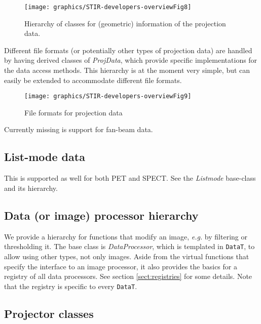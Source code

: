 \documentclass{article}
\begin{document}
\begin{figure}[htbp]
\begin{center}
\texttt{[image: graphics/STIR-developers-overviewFig8]}
\caption{ Hierarchy of classes for (geometric) information 
of the projection data.}
\label{projdatainfo-hierarchy}
\end{center}
\end{figure}


Different file formats (or potentially other types of projection 
data) are handled by having derived classes of \textit{ProjData}, 
which provide specific implementations for the data access methods. 
This hierarchy is at the moment very simple, but can easily be 
extended to accommodate different file formats.

\begin{figure}[htbp]
\begin{center}
\texttt{[image: graphics/STIR-developers-overviewFig9]}
\caption{ File formats for projection data}
\end{center}
\end{figure}


Currently missing is support for fan-beam data.

\subsection{
List-mode data}

This is supported as well for both PET and SPECT. See the \textit{Listmode} base-class and its hierarchy.

\subsection{
Data (or image) processor hierarchy}

We provide a hierarchy for functions that modify an image, \textit{e.g.} by 
filtering or thresholding it. The base class is \textit{DataProcessor},
which is templated in \texttt{DataT}, to allow using other types, not
only images.
Aside from the virtual functions that specify the interface to 
an image processor, it also provides the basics for a registry 
of all data processors. See section \ref{sect:registries} for some details.
Note that the registry is specific to every \texttt{DataT}.

\subsection{
Projector classes}
\end{document}
